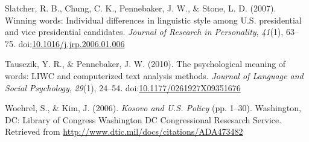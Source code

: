 \documentclass[english,man]{apa6}
\theoremstyle{definition}
\theoremstyle{definition}
\theoremstyle{definition}
\theoremstyle{remark}
\begin{document}
\hypertarget{ref-Slatcher2007}{}
Slatcher, R. B., Chung, C. K., Pennebaker, J. W., \& Stone, L. D.
(2007). Winning words: Individual differences in linguistic style among
U.S. presidential and vice presidential candidates. \emph{Journal of
Research in Personality}, \emph{41}(1), 63--75.
doi:\href{https://doi.org/10.1016/j.jrp.2006.01.006}{10.1016/j.jrp.2006.01.006}

\hypertarget{ref-Tausczik2010}{}
Tausczik, Y. R., \& Pennebaker, J. W. (2010). The psychological meaning
of words: LIWC and computerized text analysis methods. \emph{Journal of
Language and Social Psychology}, \emph{29}(1), 24--54.
doi:\href{https://doi.org/10.1177/0261927X09351676}{10.1177/0261927X09351676}

\hypertarget{ref-Woehrel2006}{}
Woehrel, S., \& Kim, J. (2006). \emph{Kosovo and U.S. Policy} (pp.
1--30). Washington, DC: Library of Congress Washington DC Congressional
Resesarch Service. Retrieved from
\url{http://www.dtic.mil/docs/citations/ADA473482}
\end{document}
